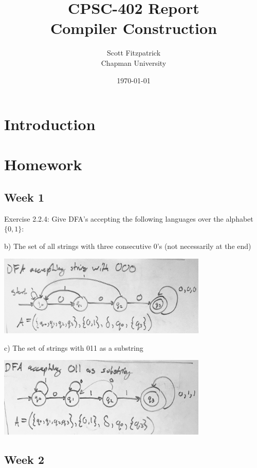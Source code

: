 \documentclass{article}
\title{CPSC-402 Report\\Compiler Construction}
\author{Scott Fitzpatrick  \\ Chapman University}
\date{\today}
\theoremstyle{theorem}
\theoremstyle{definition}
\theoremstyle{remark}
\begin{document}
\maketitle

\begin{abstract}

\end{abstract}

\tableofcontents


\section{Introduction}\label{intro}


\section{Homework}\label{homework}

\subsection{Week 1}

\noindent
Exercise 2.2.4: Give DFA's accepting the following languages over the alphabet $\{0,1\}$:

\medskip
b) The set of all strings with three consecutive 0's (not necessarily at the end)

\includegraphics[width=0.75\textwidth]{Images/2.4.4b.png}

\medskip
c) The set of strings with 011 as a substring

\includegraphics[width=0.75\textwidth]{Images/2.4.4c.png}


\subsection{Week 2}
\end{document}
